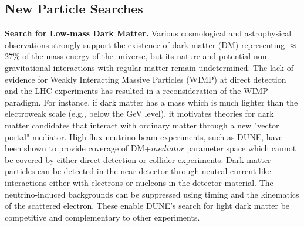\subsection{New Particle Searches}
{\bf Search for Low-mass Dark Matter.}
Various cosmological and astrophysical observations strongly support the existence of dark matter (DM) representing $\approx$27$\%$ of the mass-energy of the universe, but its nature and potential non-gravitational interactions with regular matter remain undetermined. 
The lack of evidence for Weakly Interacting Massive Particles (WIMP) at direct detection and the LHC experiments has resulted in a reconsideration of the WIMP paradigm. For instance, if  dark matter has a mass which is much lighter than the electroweak scale (e.g., below the GeV level), it motivates theories for  dark matter candidates that interact with ordinary matter through a new "vector portal" mediator.
High flux neutrino beam experiments, such as DUNE, have been shown to provide coverage of DM+$mediator$ parameter space which cannot be covered by either direct detection or collider experiments. %
Dark
matter particles can be detected in the near detector through neutral-current-like interactions 
either with electrons or nucleons in the detector material.
The neutrino-induced backgrounds can be suppressed using timing and the kinematics of the scattered electron.
These enable DUNE's search for light dark matter be competitive and complementary to other experiments.\\

